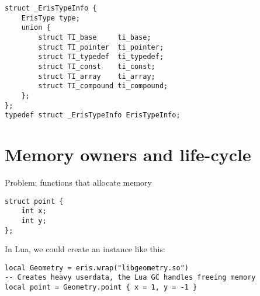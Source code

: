 \begin{verbatim}
struct _ErisTypeInfo {
    ErisType type;
    union {
        struct TI_base     ti_base;
        struct TI_pointer  ti_pointer;
        struct TI_typedef  ti_typedef;
        struct TI_const    ti_const;
        struct TI_array    ti_array;
        struct TI_compound ti_compound;
    };
};
typedef struct _ErisTypeInfo ErisTypeInfo;
\end{verbatim}


\section{Memory owners and life-cycle}

Problem: functions that allocate memory

\begin{verbatim}
struct point {
	int x;
	int y;
};
\end{verbatim}

In Lua, we could create an instance like this:

\begin{verbatim}
local Geometry = eris.wrap("libgeometry.so")
-- Creates heavy userdata, the Lua GC handles freeing memory
local point = Geometry.point { x = 1, y = -1 }
\end{verbatim}

